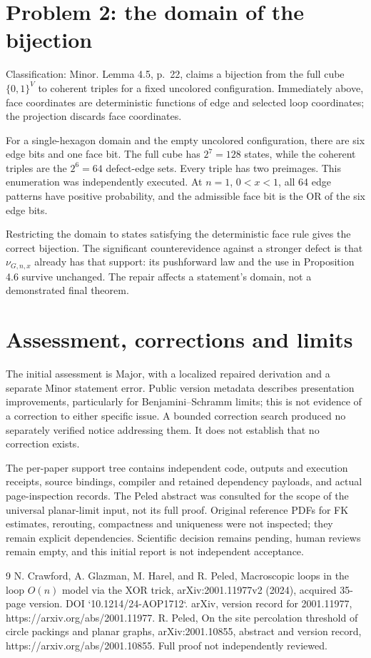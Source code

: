 \documentclass[10pt]{article}
\begin{document}
\section*{Problem 2: the domain of the bijection}
Classification: Minor. Lemma 4.5, p. 22, claims a bijection from the full cube \(\{0,1\}^{V}\) to coherent triples for a fixed uncolored configuration. Immediately above, face coordinates are deterministic functions of edge and selected loop coordinates; the projection discards face coordinates.\par
For a single-hexagon domain and the empty uncolored configuration, there are six edge bits and one face bit. The full cube has \(2^7=128\) states, while the coherent triples are the \(2^6=64\) defect-edge sets. Every triple has two preimages. This enumeration was independently executed. At \(n=1\), \(0<x<1\), all 64 edge patterns have positive probability, and the admissible face bit is the OR of the six edge bits.\par
Restricting the domain to states satisfying the deterministic face rule gives the correct bijection. The significant counterevidence against a stronger defect is that \(\nu_{G,n,x}\) already has that support: its pushforward law and the use in Proposition 4.6 survive unchanged. The repair affects a statement’s domain, not a demonstrated final theorem.\par
\section*{Assessment, corrections and limits}
The initial assessment is Major, with a localized repaired derivation and a separate Minor statement error. Public version metadata describes presentation improvements, particularly for Benjamini–Schramm limits; this is not evidence of a correction to either specific issue. A bounded correction search produced no separately verified notice addressing them. It does not establish that no correction exists.\par
The per-paper support tree contains independent code, outputs and execution receipts, source bindings, compiler and retained dependency payloads, and actual page-inspection records. The Peled abstract was consulted for the scope of the universal planar-limit input, not its full proof. Original reference PDFs for FK estimates, rerouting, compactness and uniqueness were not inspected; they remain explicit dependencies. Scientific decision remains pending, human reviews remain empty, and this initial report is not independent acceptance.\par
9 N. Crawford, A. Glazman, M. Harel, and R. Peled, Macroscopic loops in the loop \(O(n)\) model via the XOR trick, arXiv:2001.11977v2 (2024), acquired 35-page version. DOI `10.1214/24-AOP1712`. arXiv, version record for 2001.11977, https://arxiv.org/abs/2001.11977. R. Peled, On the site percolation threshold of circle packings and planar graphs, arXiv:2001.10855, abstract and version record, https://arxiv.org/abs/2001.10855. Full proof not independently reviewed.\par
\end{document}
